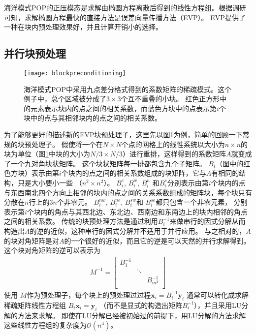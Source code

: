 海洋模式POP的正压模态是求解由椭圆方程离散后得到的线性方程组。根据调研可知，求解椭圆方程最快的直接方法是误差向量传播方法（EVP）\cite{roache1995elliptic}。 
EVP提供了一种在块内预处理效果好，并且计算开销小的选择。




\subsection{并行块预处理} 
\label{precond:EVP:Parallel}
 
\begin{figure}[!t]
\centering
\texttt{[image: blockpreconditioning]}
\caption[] {海洋模式POP中采用九点差分格式得到的系数矩阵的稀疏模式。这个例子中，总个区域被分成了$3\times3$个互不重叠的小块。
红色正方形中的元素表示块内的点之间的相关系数，而蓝色方块中的点表示第$i$个块中的点与其相邻块内的点之间的相关系数。 \label{fig:blockprecond}}
\end{figure}
 
为了能够更好的描述新的EVP块预处理子，这里先以图\ref{fig:blockprecond}为例，简单的回顾一下常规的块预处理子。 
假使将一个在$N \times N$个点的网格上的线性系统以大小为$n\times n$的块为单位（图\ref{fig:blockprecond}中块的大小为$N/3\times N/3$）进行重排，这样得到的系数矩阵$A$就变成了一个九对角块状矩阵。
这个块状矩阵每一排都包含九个子矩阵。 
$B_i$（图中的红色方块）表示由第$i$个块内的点之间的相关系数组成的块矩阵，它与$A$有相同的结构，只是大小要小一些 （$n^2\times n^2$）。 
$B_i^e$, $B_i^w$, $B_i^n$ 和$B_i^s$分别表示由第$i$个块内的点与东西南北四个方向上相邻的块内的点之间的关系系数组成的矩阵块，每个块只有分散在$n$行上的$3n$个非零元。
$B_i^{nw}$, $B_i^{ne}$, $B_i^{sw}$和 $B_i^{se}$都只包含一个非零元素， 分别表示第$i$个块内的角点与其西北边、东北边、西南边和东南边上的块内相邻的角点之间的相关系数。 
传统的块预处理方法是通过利用$B_i^{-1}$来做串行的因式分解从而构造出$A$的逆的近似，这种串行的因式分解并不适用于并行应用。
与之相对的，$A$的块对角矩阵是对$A$的一个很好的近似，而且它的逆是可以天然的并行求解得到。
这个块对角矩阵的逆可以表示为 
\begin{eqnarray*}
M^{-1}=    \left [
        \begin{array}{ccccccc}
        B_1^{-1} &   &  \\
         & \ddots&  \\
        &   &  B_{m^2}^{-1} \\
    \end{array}
    \right ]
\end{eqnarray*}
使用 $M$作为预处理子，每个块上的预处理过过程$\textbf{x}_i
= B_i^{-1}\textbf{y}_i$ 通常可以转化成求解稀疏矩阵线性方程组 $B_i \textbf{x}_i = \textbf{y}_i$
（而不是显式的构造出矩阵$B_i^{-1}$），并且采用LU分解的方法来求解。  
即使在LU分解已经被初始过的前提下，用LU分解的方法求解这些线性方程组的复杂度为$\mathcal{O}(n^4)$\cite{golub2012matrix}。
 


